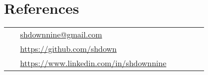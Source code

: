 \documentclass[10pt]{article}
\begin{document}
\medskip

\section{References}

\parbox[top][0.12\textheight][c]{\linewidth}{
    \vspace{-0.04\textheight}
    \colorbox{shade}{
        \begin{supertabular}{p{0.05\linewidth}|p{0.775\linewidth}}
            \raisebox{0pt}{\small  \faEnvelope}        & \href{mailto:shdownnine@gmail.com}{shdownnine@gmail.com} \\
            \raisebox{-1pt}{\small \faGithubAlt}       & \href{https://github.com/shdown}{https://github.com/shdown} \\
            \raisebox{-1pt}{\small \faLinkedinSquare}  & \href{https://www.linkedin.com/in/shdownnine}{https://www.linkedin.com/in/shdownnine} \\
        \end{supertabular}
    }
}
\end{document}
